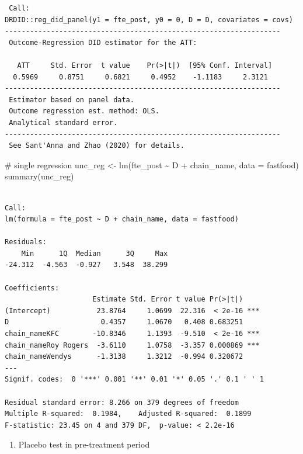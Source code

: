 \documentclass[
  letterpaper,
  DIV=11,
  numbers=noendperiod]{scrreprt}
\newenvironment{Shaded}{\begin{snugshade}}{\end{snugshade}}
\newcommand{\AttributeTok}[1]{\textcolor[rgb]{0.40,0.45,0.13}{#1}}
\newcommand{\CommentTok}[1]{\textcolor[rgb]{0.37,0.37,0.37}{#1}}
\newcommand{\FunctionTok}[1]{\textcolor[rgb]{0.28,0.35,0.67}{#1}}
\newcommand{\NormalTok}[1]{\textcolor[rgb]{0.00,0.23,0.31}{#1}}
\newcommand{\OtherTok}[1]{\textcolor[rgb]{0.00,0.23,0.31}{#1}}
\newcommand{\SpecialCharTok}[1]{\textcolor[rgb]{0.37,0.37,0.37}{#1}}
\providecommand{\tightlist}{%
  \setlength{\itemsep}{0pt}\setlength{\parskip}{0pt}}\usepackage{longtable,booktabs,array}
\begin{document}
\begin{verbatim}
 Call:
DRDID::reg_did_panel(y1 = fte_post, y0 = 0, D = D, covariates = covs)
------------------------------------------------------------------
 Outcome-Regression DID estimator for the ATT:
 
   ATT     Std. Error  t value    Pr(>|t|)  [95% Conf. Interval] 
  0.5969     0.8751     0.6821     0.4952    -1.1183     2.3121  
------------------------------------------------------------------
 Estimator based on panel data.
 Outcome regression est. method: OLS.
 Analytical standard error.
------------------------------------------------------------------
 See Sant'Anna and Zhao (2020) for details.
\end{verbatim}

\begin{Shaded}
\begin{Highlighting}[]
\CommentTok{\# single regression}
\NormalTok{unc\_reg }\OtherTok{\textless{}{-}} \FunctionTok{lm}\NormalTok{(fte\_post }\SpecialCharTok{\textasciitilde{}}\NormalTok{ D }\SpecialCharTok{+}\NormalTok{ chain\_name, }\AttributeTok{data =}\NormalTok{ fastfood)}
\FunctionTok{summary}\NormalTok{(unc\_reg)}
\end{Highlighting}
\end{Shaded}

\begin{verbatim}

Call:
lm(formula = fte_post ~ D + chain_name, data = fastfood)

Residuals:
    Min      1Q  Median      3Q     Max 
-24.312  -4.563  -0.927   3.548  38.299 

Coefficients:
                     Estimate Std. Error t value Pr(>|t|)    
(Intercept)           23.8764     1.0699  22.316  < 2e-16 ***
D                      0.4357     1.0670   0.408 0.683251    
chain_nameKFC        -10.8346     1.1393  -9.510  < 2e-16 ***
chain_nameRoy Rogers  -3.6110     1.0758  -3.357 0.000869 ***
chain_nameWendys      -1.3138     1.3212  -0.994 0.320672    
---
Signif. codes:  0 '***' 0.001 '**' 0.01 '*' 0.05 '.' 0.1 ' ' 1

Residual standard error: 8.266 on 379 degrees of freedom
Multiple R-squared:  0.1984,    Adjusted R-squared:  0.1899 
F-statistic: 23.45 on 4 and 379 DF,  p-value: < 2.2e-16
\end{verbatim}

\begin{enumerate}
\def\labelenumi{\arabic{enumi}.}
\setcounter{enumi}{2}
\tightlist
\item
  Placebo test in pre-treatment period
\end{enumerate}
\end{document}
